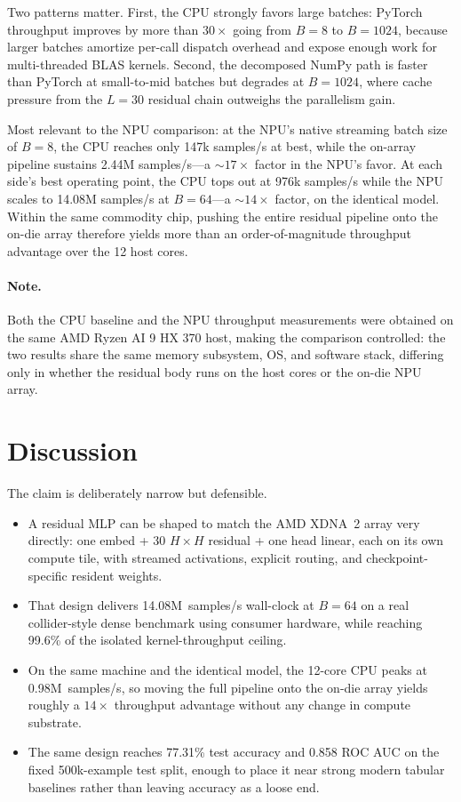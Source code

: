 \documentclass[a4paper,11pt]{article}
\begin{document}
Two patterns matter. First, the CPU strongly favors large batches: PyTorch
throughput improves by more than $30\times$ going from $B=8$ to $B=1024$,
because larger batches amortize per-call dispatch overhead and expose enough
work for multi-threaded BLAS kernels. Second, the decomposed NumPy path is
faster than PyTorch at small-to-mid batches but degrades at $B=1024$, where
cache pressure from the $L=30$ residual chain outweighs the parallelism gain.

Most relevant to the NPU comparison: at the NPU's native streaming batch size
of $B=8$, the CPU reaches only 147k samples/s at best, while the on-array
pipeline sustains 2.44M samples/s---a $\sim\!17\times$ factor in the NPU's
favor. At each side's best operating point, the CPU tops out at 976k
samples/s while the NPU scales to 14.08M samples/s at $B=64$---a
$\sim\!14\times$ factor, on the identical model. Within the same commodity
chip, pushing the entire residual pipeline onto the on-die array therefore
yields more than an order-of-magnitude throughput advantage over the 12 host
cores.

\paragraph{Note.}
Both the CPU baseline and the NPU throughput measurements were obtained on the
same AMD Ryzen AI 9 HX 370 host, making the comparison controlled: the two
results share the same memory subsystem, OS, and software stack, differing only
in whether the residual body runs on the host cores or the on-die NPU array.

\section{Discussion}

The claim is deliberately narrow but defensible.
\begin{itemize}
  \item A residual MLP can be shaped to match the AMD XDNA~2 array very
        directly: one embed + 30 $H \times H$ residual + one head linear, each
        on its own compute tile, with streamed activations, explicit routing,
        and checkpoint-specific resident weights.
  \item That design delivers 14.08M~samples/s wall-clock at $B=64$ on a real
        collider-style dense benchmark using consumer hardware, while reaching
        99.6\% of the isolated kernel-throughput ceiling.
  \item On the same machine and the identical model, the 12-core CPU peaks at
        0.98M~samples/s, so moving the full pipeline onto the on-die array
        yields roughly a $14\times$ throughput advantage without any change in
        compute substrate.
  \item The same design reaches 77.31\% test accuracy and 0.858 ROC AUC on the
        fixed 500k-example test split, enough to place it near strong modern
        tabular baselines rather than leaving accuracy as a loose end.
\end{itemize}
\end{document}
